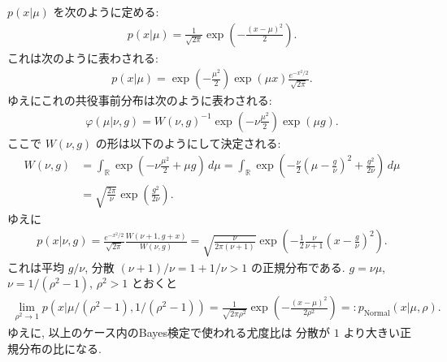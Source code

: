 \documentclass[12pt,twoside]{jarticle}
\newcommand\R{{\mathbb R}} %
\theoremstyle{jplain}
\theoremstyle{jplain}
\theoremstyle{jplain}
\numberwithin{theorem}{section}
\numberwithin{equation}{section}
\numberwithin{figure}{section}
\numberwithin{table}{section}
\begin{document}
$p(x|\mu)$ を次のように定める:
\begin{align*}
  p(x|\mu) = \frac{1}{\sqrt{2\pi}}\exp\left(-\frac{(x-\mu)^2}{2}\right).
\end{align*}
これは次のように表わされる:
\begin{align*}
  p(x|\mu)
  = \exp\left(-\frac{\mu^2}{2}\right)\exp\left(\mu x\right)
    \frac{e^{-x^2/2}}{\sqrt{2\pi}}.
\end{align*}
ゆえにこれの共役事前分布は次のように表わされる:
\begin{align*}
  \varphi(\mu|\nu,g)
  = W(\nu,g)^{-1}\exp(-\nu\frac{\mu^2}{2})\exp(\mu g).
\end{align*}
ここで $W(\nu,g)$ の形は以下のようにして決定される:
\begin{align*}
  W(\nu,g)
  &
  = \int_\R \exp\left(-\nu\frac{\mu^2}{2}+\mu g\right)\,d\mu
  = \int_\R \exp\left(
    -\frac{\nu}{2}\left(\mu-\frac{g}{\nu}\right)^2
    +\frac{g^2}{2\nu}
    \right)\,d\mu
  \\ &
  =\sqrt{\frac{2\pi}{\nu}}
  \exp\left(\frac{g^2}{2\nu}\right).
\end{align*}
ゆえに
\begin{align*}
  p(x|\nu,g)
  = \frac{e^{-x^2/2}}{\sqrt{2\pi}}\frac{W(\nu+1,g+x)}{W(\nu,g)}
  = \sqrt{\frac{\nu}{2\pi(\nu+1)}}
  \exp\left(
    -\frac{1}{2}\frac{\nu}{\nu+1}\left(x-\frac{g}{\nu}\right)^2
  \right).
\end{align*}
これは平均 $g/\nu$, 分散 $(\nu+1)/\nu=1+1/\nu>1$ の正規分布である.
$g = \nu\mu$, $\nu=1/(\rho^2-1)$, $\rho^2>1$ とおくと
\begin{align*}
  \lim_{\rho^2\to1}
  p(x|\mu/(\rho^2-1),1/(\rho^2-1))
  = \frac{1}{\sqrt{2\pi\rho^2}}\exp\left(-\frac{(x-\mu)^2}{2\rho^2}\right)
  =: p_{\mathrm{Normal}}(x|\mu,\rho).
\end{align*}
ゆえに, 以上のケース内のBayes検定で使われる尤度比は
分散が $1$ より大きい正規分布の比になる.
\end{document}
